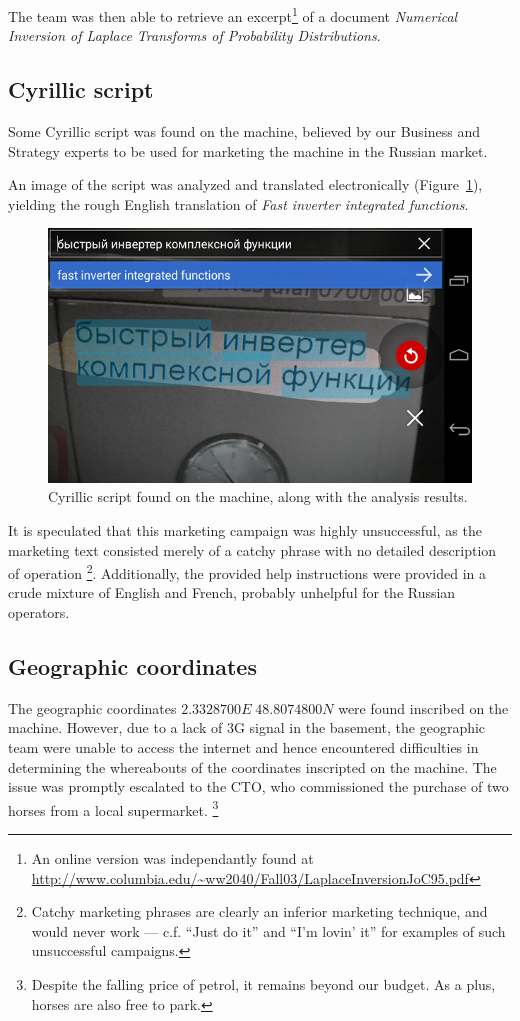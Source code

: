 The team was then able to retrieve an excerpt\footnote{An online version was independantly found at \url{http://www.columbia.edu/~ww2040/Fall03/LaplaceInversionJoC95.pdf}} of a document \emph{Numerical Inversion of Laplace Transforms of Probability Distributions}.



\subsection{Cyrillic script}
Some Cyrillic script was found on the machine, believed by our Business and Strategy experts to be used for marketing the machine in the Russian market.

An image of the script was analyzed and translated electronically (Figure~\ref{fig:cyrillic-script}), yielding the rough English translation of \emph{Fast inverter integrated functions}.

\begin{figure}[h]
	\centering
	\includegraphics[width=0.9\columnwidth]{img/cyrillic-script.png}
	\caption{Cyrillic script found on the machine, along with the analysis results.}
	\label{fig:cyrillic-script}
\end{figure}

It is speculated that this marketing campaign was highly unsuccessful, as the marketing text consisted merely of a catchy phrase with no detailed description of operation \footnote{Catchy marketing phrases are clearly an inferior marketing technique, and would never work --- c.f. ``Just do it'' and ``I'm lovin' it'' for examples of such unsuccessful campaigns.}. Additionally, the provided help instructions were provided in a crude mixture of English and French, probably unhelpful for the Russian operators.




\subsection{Geographic coordinates}
The geographic coordinates $2.3328700E \; 48.8074800N$ were found inscribed on the machine. However, due to a lack of 3G signal in the basement, the geographic team were unable to access the internet and hence encountered difficulties in determining the whereabouts of the coordinates inscripted on the machine. The issue was promptly escalated to the CTO, who commissioned the purchase of two horses from a local supermarket. \footnote{Despite the falling price of petrol, it remains beyond our budget. As a plus, horses are also free to park.}

